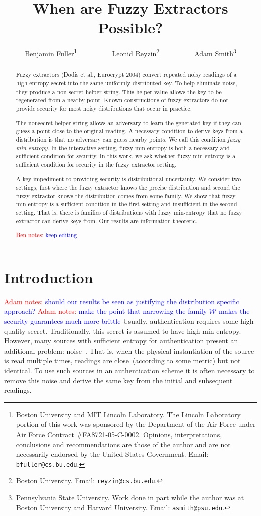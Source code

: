 \documentclass[11pt]{article}
\title{When are Fuzzy Extractors Possible?}
\author{Benjamin Fuller\footnote{Boston University and MIT Lincoln Laboratory. 
The Lincoln Laboratory portion of this work was sponsored by the Department of the Air Force under Air Force Contract \#FA8721-05-C-0002.  Opinions, interpretations, conclusions and recommendations are those of the author and are not necessarily endorsed by the United States Government.  
Email: {\tt bfuller@cs.bu.edu}.}~~~~~~~~~~Leonid Reyzin\footnote{Boston University.  Email: {\tt reyzin@cs.bu.edu}.}~~~~~~~~~~Adam Smith\footnote{Pennsylvania State University. Work done in part while the author was at Boston University and Harvard University.  Email: {\tt asmith@psu.edu}.  }}
\newcommand{\authnote}[2]{{\textcolor{red}{\textsf{#1 notes: }\textcolor{blue}{ #2}}\marginpar{\textcolor{red}{\textbf{!!!!!}}}}}
\newcommand{\authnote}[2]{}
\newcommand{\bnote}[1]{{\authnote{Ben}{#1}}}
\newcommand{\anote}[1]{{\authnote{Adam}{#1}}}
\begin{document}
\maketitle

\begin{abstract}
Fuzzy extractors (Dodis et al., Eurocrypt 2004) convert repeated noisy readings of a high-entropy secret into the same uniformly distributed key. To help eliminate noise, they produce a non secret helper string. This helper value allows the key to be regenerated from a nearby point.  Known constructions of fuzzy extractors do not provide security for most noisy distributions that occur in practice.

The nonsecret helper string allows an adversary to learn the generated key if they can guess a point close to the original reading.  A necessary condition to derive keys from a distribution is that no adversary can guess nearby points.  We call this condition \emph{fuzzy min-entropy}.  In the interactive setting, fuzzy min-entropy is both a necessary and sufficient condition for security.  In this work, we ask whether fuzzy min-entropy is a sufficient condition for security in the fuzzy extractor setting.

A key impediment to providing security is distributional uncertainty.  We consider two settings, first where the fuzzy extractor knows the precise distribution and second the fuzzy extractor knows the distribution comes from some family.  We show that fuzzy min-entropy is a sufficient condition in the first setting and insufficient in the second setting.  That is, there is families of distributions with fuzzy min-entropy that no fuzzy extractor can derive keys from.  Our results are information-theoretic.


\bnote{keep editing}
\end{abstract}

\section{Introduction}
\anote{should our results be seen as justifying the distribution specific approach?}
\anote{make the point that narrowing the family $\mathcal{W}$ makes the security guarantees much more brittle}
Usually, authentication requires some high quality secret.  Traditionally, this secret is assumed to have high min-entropy.  However, many sources with sufficient entropy for authentication present an additional problem: noise~\cite{daugman2004,zviran1993comparison,brostoff2000passfaces,ellison2000protecting,mayrhofer2009shake,monrose2002password,pappu2002physical,tuyls2006puf,gassend2002silicon,suh2007physical,bennett1988privacy}.  That is, when the physical instantiation of the source is read multiple times, readings are close~(according to some metric) but not identical.  To use such sources in an authentication scheme it is often necessary to remove this noise and derive the same key from the initial and subsequent readings.
\end{document}
